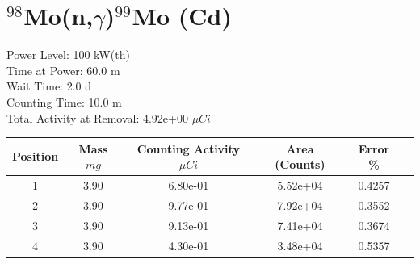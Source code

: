 \newpage

\section*{ $^{98}$Mo(n,$\gamma$)$^{99}$Mo (Cd) }

Power Level: 100 kW(th) \\
Time at Power: 60.0 m \\
Wait Time:  2.0 d \\
Counting Time: 10.0 m \\
Total Activity at Removal: 4.92e+00 $\mu Ci$

\begin{table}[h]
\centering
\begin{tabular}{ |c|c|c|c|c|c| }
 \hline
 Position & Mass $mg$ & Counting Activity $\mu Ci$ & Area (Counts) & Error \% \\
 \hline 
 1 & 3.90 & 6.80e-01 & 5.52e+04 & 0.4257 \\ 
\hline
 2 & 3.90 & 9.77e-01 & 7.92e+04 & 0.3552 \\ 
\hline
 3 & 3.90 & 9.13e-01 & 7.41e+04 & 0.3674 \\ 
\hline
 4 & 3.90 & 4.30e-01 & 3.48e+04 & 0.5357 \\ 
\hline
\end{tabular}
\end{table}

